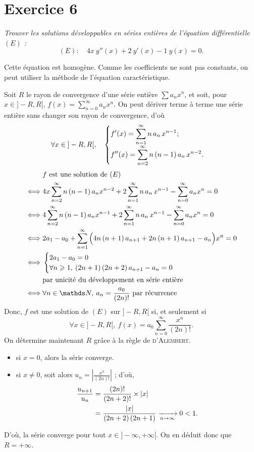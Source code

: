 \section{Exercice 6}

\textsl{Trouver les solutions développables en séries entières de l'équation différentielle $(E)$\/ :  \[
	(E) : \quad 4x\:y''(x) + 2\:y'(x) - 1\:y(x) = 0
.\] }

Cette équation est homogène. Comme les coefficients ne sont pas constants, on  peut  utiliser la méthode de l'équation caractéristique.

Soit $R$\/ le rayon de convergence d'une série entière $\sum a_n x^n$, et soit, pour $x \in {]-R,R[}$, $f(x) = \sum_{n=0}^\infty a_n x^n$.
On peut dériver terme à terme une série entière sans changer son rayon de convergence, d'où \[
	\forall x \in {]-R,R[}, \quad \begin{cases}
		\displaystyle f'(x) = \sum_{n=1}^\infty n\, a_n\, x^{n-1} ;\\
		\displaystyle f''(x) = \sum_{n=2}^\infty n\,(n-1)\,a_n\,x^{n - 2}.
	\end{cases}
\]
\begin{align*}
	&f \text{ est une solution de } (E) \\
	\iff& 4x \sum_{n=2}^\infty n\,(n-1)\, a_n x^{n-2} + 2 \sum_{n=1}^\infty n\,a_n\,x^{n-1} - \sum_{n=0}^\infty a_n x^n = 0 \\
	\iff& 4 \sum_{n=2}^\infty n\,(n-1)\, a_n x^{n-1} + 2 \sum_{n=1}^\infty n\,a_n\,x^{n-1} - \sum_{n=0}^\infty a_n x^n = 0 \\
	\iff& 2a_1 - a_0 + \sum_{n=1}^\infty \Big( 4n\,(n+1)\,a_{n+1} + 2n\,(n+1)\,a_{n+1} -a_n \Big) x^n = 0 \\
	\iff&\begin{cases}
		\ds 2a_1 - a_0 = 0\\
		\ds\forall n \ge 1,\: (2n+1)\,(2n+2)\,a_{n+1} -a_n = 0
	\end{cases}\\
	&\text{par unicité du développement en série entière }\\
	\iff& \forall n \in \N,\: a_n = \frac{a_0}{(2n)!} \text{ par récurrence}\\
\end{align*}
Donc, $f$\/ est une solution de $(E)$\/ sur $]-R,R[$ si, et seulement si \[
	\forall x \in {]-R,R[},\:f(x) = a_0 \sum_{n=0}^\infty \frac{x^n}{(2n)!}
.\]
On détermine maintenant $R$\/ grâce à la règle de \textsc{d'Alembert}.
\begin{itemize}
	\item si $x = 0$, alors la série converge.
	\item si $x \neq 0$, soit alors $u_n = \left| \frac{x^n}{(2n)!} \right|$ ; d'où,
		\begin{align*}
			\frac{u_{n+1}}{u_n} &= \frac{(2n)!}{(2n+2)!} \times |x|\\
			&= \frac{|x|}{(2n+2)\,(2n+1)} \xrightarrow[n\to \infty]{} 0 < 1. \\
		\end{align*}
\end{itemize}
D'où, la série converge pour tout $x \in {]-\infty,+\infty[}$. On en déduit donc que $R = +\infty$.

